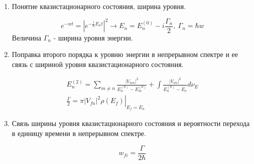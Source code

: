 \documentclass{article}
\begin{document}
\begin{enumerate}
	\item {Понятие квазистационарного состояния, ширина уровня.}
	
	\begin{equation}
		e^{-wt} = |e^{-\frac{i}{\hbar}E_n t}|^2 \rightarrow E_n = E_n^{(0)} - i\frac{\Gamma_n}{2}, \ \Gamma_n=\hbar w
	\end{equation}
	Величина $\Gamma_n$ - ширина уровня энергии.
	
	\item {Поправка второго порядка к уровню энергии в непрерывном спектре и ее связь с шириной
уровня квазистационарного состояния.}

	\begin{gather}
		E_n^{(2)} = \sum\limits_{m\neq n} \frac{|V_{mn}|^2}{E_n^{(0)} - E_m^{(0)}} + \int \frac{|V_{\nu n}|^2}{E_n^{(0)} - E_\nu} d\nu_E \\
		\frac{\Gamma}{2} = \left.\pi |V_{fn}|^2 \rho(E_f)\right|_{E_f=E_n}
	\end{gather}
	
	\item {Связь ширины уровня квазистационарного состояния и вероятности перехода в единицу времени в непрерывном спектре.}
	
	\begin{equation}
		w_{fi} = \frac{\Gamma}{2\hbar}
	\end{equation}
\end{enumerate}
	
{}
\end{document}
